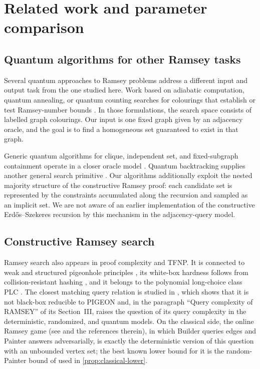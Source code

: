 \section{Related work and parameter comparison}
\label{sec:prior-art}

\subsection{Quantum algorithms for other Ramsey tasks}

Several quantum approaches to Ramsey problems address a different input and
output task from the one studied here.  Work based on adiabatic computation,
quantum annealing, or quantum counting searches for colourings that establish
or test Ramsey-number bounds
\cite{GaitanClark2012,BianEtAl2013,Wang2016,QuLiWangBaoCao2013,
RanjbarMacreadyClarkGaitan2016,PionMniszewski2025}.  In those formulations,
the search space consists of labelled graph colourings.  Our input is one
fixed graph given by an adjacency oracle, and the goal is to find a
homogeneous set guaranteed to exist in that graph.

Generic quantum algorithms for clique, independent set, and fixed-subgraph
containment operate in a closer oracle model
\cite{Doern2005,ChildsEisenberg2005,LeeMagniezSantha2012,Zhu2012}.  Quantum
backtracking supplies another general search primitive \cite{Montanaro2018}.
Our algorithms additionally exploit the nested majority structure of the
constructive Ramsey proof: each candidate set is represented by the
constraints accumulated along the recursion and sampled as an implicit set.
We are not aware of an earlier implementation of the constructive
Erd\H{o}s--Szekeres recursion by this mechanism in the adjacency-query model.

\subsection{Constructive Ramsey search}

Ramsey search also appears in proof complexity and TFNP.  It is connected to
weak and structured pigeonhole principles
\cite{Krajicek2001,Krajicek2005}, its white-box hardness follows from
collision-resistant hashing \cite{KomargodskiNaorYogev2019}, and it belongs
to the polynomial long-choice class PLC
\cite{PasarkarPapadimitriouYannakakis2023}.  The closest matching query
relation is studied in \cite{JainLiRobereXun2024}, which shows that it is
not black-box reducible to PIGEON and, in the paragraph ``Query complexity
of RAMSEY'' of its Section~III, raises the question of its query
complexity in the deterministic, randomized, and quantum models.  On the
classical side, the online Ramsey game (see \cite{ConlonFoxGrinshpunHe2019}
and the references therein), in which Builder queries edges and Painter
answers adversarially, is exactly the deterministic version of this
question with an unbounded vertex set; the best known lower bound for it is
the random-Painter bound of \cite{ConlonFoxGrinshpunHe2019} used in
\cref{prop:classical-lower}.


